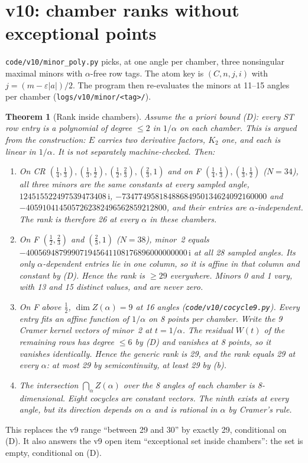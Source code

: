 \documentclass[11pt,a4paper]{article}
\newcommand{\ii}{\mathrm i}
\newcommand{\loc}[1]{\nolinkurl{#1}}
\theoremstyle{plain}
\newtheorem{theorem}{Theorem}[section]
\theoremstyle{definition}
\theoremstyle{remark}
\numberwithin{equation}{section}
\begin{document}
\section{v10: chamber ranks without exceptional points}
\label{sec:v10chamber}

\loc{code/v10/minor_poly.py} picks, at one angle per chamber, three
nonsingular maximal minors with \(\alpha\)-free row tags. The atom
key is \((C,n,j,i)\) with \(j=(m-\varepsilon|a|)/2\). The program
then re-evaluates the minors at 11--15 angles per chamber
(\loc{logs/v10/minor/<tag>/}).

\begin{theorem}[Rank inside chambers]
\label{thm:v10chamber}
Assume the a priori bound (D): every ST row entry is a polynomial of
degree \(\le2\) in \(1/\alpha\) on each chamber. This is argued from
the construction: \(E\) carries two derivative factors, \(K_2\) one,
and each is linear in \(1/\alpha\). It is not separately
machine-checked. Then:
\begin{enumerate}[label=(\alph*)]
\item On CR \((\tfrac14,\tfrac13),(\tfrac13,\tfrac12),(\tfrac12,\tfrac23),(\tfrac23,1)\)
and on F \((\tfrac14,\tfrac13),(\tfrac13,\tfrac12)\) (\(N=34\)), all
three minors are the same constants at every sampled angle,
\(124515522497539473408\,\ii\),
\(-73477495818488684950134624092160000\) and
\(-4059104145057262382496562859212800\), and their entries are
\(\alpha\)-independent. The rank is therefore 26 at \emph{every}
\(\alpha\) in these chambers.
\item On F \((\tfrac12,\tfrac23)\) and \((\tfrac23,1)\) (\(N=38\)),
minor~2 equals \(-400569487999071945641108176896000000000\,\ii\) at
all 28 sampled angles. Its only \(\alpha\)-dependent entries lie in
one column, so it is affine in that column and constant by (D). Hence
the rank is \(\ge29\) everywhere. Minors 0 and 1 vary, with 13 and
15 distinct values, and are never zero.
\item On F above \(\tfrac12\), \(\dim Z(\alpha)=9\) at 16 angles
(\loc{code/v10/cocycle9.py}). Every entry fits an affine function of
\(1/\alpha\) on 8 points per chamber. Write the 9 Cramer kernel
vectors of minor~2 at \(t=1/\alpha\). The residual \(W(t)\) of the
remaining rows has degree \(\le6\) by (D) and vanishes at 8 points,
so it vanishes identically. Hence the generic rank is 29, and the
rank equals 29 at every \(\alpha\): at most 29 by semicontinuity,
at least 29 by (b).
\item The intersection \(\bigcap_\alpha Z(\alpha)\) over the 8
angles of each chamber is 8-dimensional. Eight cocycles are constant
vectors. The ninth exists at every angle, but its direction depends
on \(\alpha\) and is rational in \(\alpha\) by Cramer's rule.
\end{enumerate}
\end{theorem}
This replaces the v9 range ``between 29 and 30'' by exactly 29,
conditional on (D). It also answers the v9 open item ``exceptional
set inside chambers'': the set is empty, conditional on (D).
\end{document}

